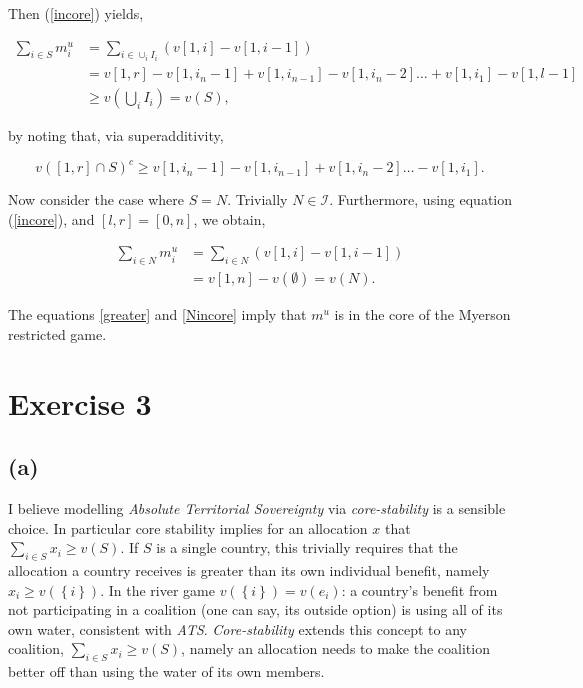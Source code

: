 \documentclass[american]{scrartcl}
\newcommand{\set}[1]{\left\{#1\right\}}
\begin{document}
Then (\ref{incore}) yields,

\begin{equation} \label{greater}
    \begin{split}
        \sum_{i \in S} m^u_i &= \sum_{i \in \cup_i I_i} \left(v[1, i] - v[1, i-1]\right) \\
        &= v[1, r] - v[1, i_n - 1] + v[1, i_{n-1}] - v[1, i_n - 2] \ldots + v[1, i_1] - v[1, l-1] \\
        &\geq v\left(\bigcup_i I_i\right) = v(S),
    \end{split}
\end{equation}

by noting that, via superadditivity,

\begin{equation}
    v\left([1, r] \cap S\right)^c \geq v[1, i_n - 1] - v[1, i_{n-1}] + v[1, i_n - 2] \ldots - v[1, i_1].
\end{equation}

Now consider the case where $S = N$. Trivially $N \in \mathcal{I}$. Furthermore, using equation (\ref{incore}), and $[l, r] = [0, n]$, we obtain,

\begin{equation} \label{Nincore}
    \begin{split}
        \sum_{i \in N} m^u_i &= \sum_{i \in N} \left(v[1, i] - v[1, i-1]\right) \\
        &= v[1, n] - v(\emptyset) = v(N).
    \end{split}
\end{equation}

The equations \ref{greater} and \ref{Nincore} imply that $m^u$ is in the core of the Myerson restricted game.

\section*{Exercise 3}

\subsection*{(a)}

I believe modelling \textit{Absolute Territorial Sovereignty} via \textit{core-stability} is a sensible choice. In particular core stability implies for an allocation $x$ that $\sum_{i \in S} x_i \geq v(S)$. If $S$ is a single country, this trivially requires that the allocation a country receives is greater than its own individual benefit, namely $x_i \geq v(\set{i})$. In the river game $v(\set{i}) = v(e_i)$: a country's benefit from not participating in a coalition (one can say, its outside option) is using all of its own water, consistent with \textit{ATS}. \textit{Core-stability} extends this concept to any coalition, $\sum_{i \in S} x_i \geq v(S)$, namely an allocation needs to make the coalition better off than using the water of its own members.
\end{document}
